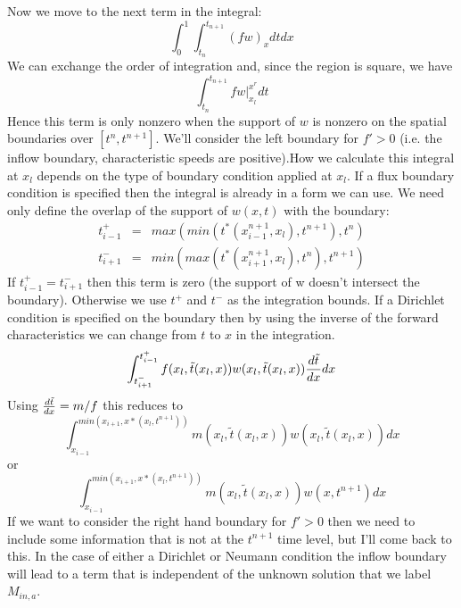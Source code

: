 \documentclass[10pt,dvips,twoside,reqno]{amsart}
\begin{document}
Now we move to the next term in the integral: 
\begin{equation} 
\int_0^1 \int_{t_n}^{t_{n+1}} (fw)_x dt dx 
\end{equation} 
We can exchange the order of integration and, since the region is
square, we have 
\begin{equation} \int_{t_n}^{t_{n+1}} fw |_{x_l}^{x^r} dt 
\end{equation} 
Hence this term is only nonzero when the support of $w$ is nonzero on
the spatial boundaries over $[t^n,t^{n+1}]$.  We'll consider the left
boundary for $f'>0$ (i.e. the inflow boundary, characteristic speeds
are positive).How we calculate this integral at $x_l$ depends on the
type of boundary condition applied at $x_l$. If a flux boundary
condition is specified then the integral is already in a form we can
use. We need only define the overlap of the support of $w(x,t)$ with
the boundary: 
\begin{eqnarray}
  t^{+}_{i-1} &=& max(min(t^{*}(x^{n+1}_{i-1},x_l),t^{n+1}),t^n) \\
  t^{-}_{i+1} &=& min(max(t^{*}(x^{n+1}_{i+1},x_l),t^{n}),t^{n+1})
\end{eqnarray} 
If $t^{+}_{i-1} = t^{-}_{i+1}$ then this term is zero
(the support of w doesn't intersect the boundary). Otherwise we use
$t^+$ and $t^-$ as the integration bounds. If a Dirichlet condition is
specified on the boundary then by using the inverse of the forward
characteristics we can change from $t$ to $x$ in the integration.
\begin{equation} 
\int_{t^{-}_{i+1}}^{t^{+}_{i-1}} f(x_l,\tilde{t}(x_l,x)) w(x_l,\tilde{t}(x_l,x)) \frac{d {\tilde{t}}}{d {x}} dx
\end{equation} 
Using $\frac{d {\tilde{t}}}{d {x}} = m/f$ this reduces to
\begin{equation} 
\int_{x_{i-1}}^{min(x_{i+1},x*(x_l,t^{n+1}))}  m(x_l,\tilde{t}(x_l,x)) w(x_l,\tilde{t}(x_l,x))dx 
\end{equation} 
or
\begin{equation} 
\int_{x_{i-1}}^{min(x_{i+1},x*(x_l,t^{n+1}))}  m(x_l,\tilde{t}(x_l,x)) w(x,t^{n+1})dx 
\end{equation} 
If we want to consider the right hand boundary for $f'>0$ then we need to include
some information that is not at the $t^{n+1}$ time level, but I'll
come back to this. In the case of either a Dirichlet or Neumann condition the inflow boundary will lead to a term that is independent of the unknown solution that we label $M_{in,a}$.
\end{document}

